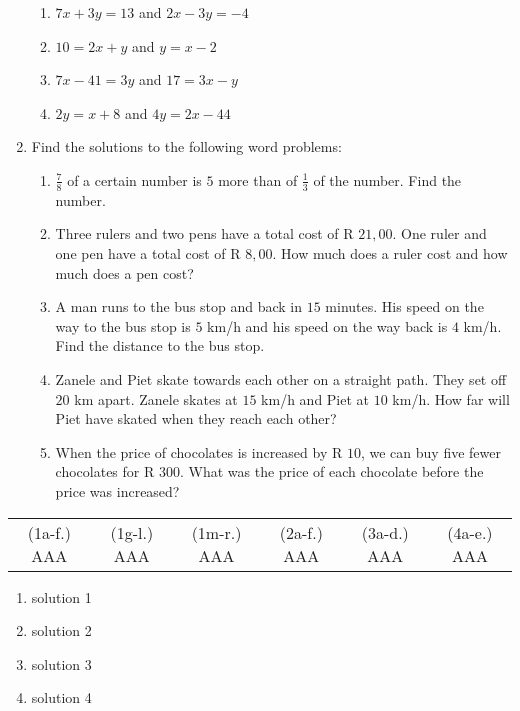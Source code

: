 \begin{eocexercises}{}
\begin{enumerate}[itemsep=5pt, label=\textbf{\arabic*}. ]
\begin{enumerate}[itemsep=5pt,label=\textbf{(\alph*)}]
\item $7x+3y=13$ and $2x-3y=-4$  
\item $10=2x+y$ and $y=x-2$
\item $7x-41=3y$ and $17=3x-y$
\item $2y=x+8$ and $4y=2x-44$
\end{enumerate}
\item Find the solutions to the following word problems:
\begin{enumerate}[itemsep=5pt,label=\textbf{(\alph*)}]
\item $\frac{7}{8}$ of a certain number is $5$ more than of $\frac{1}{3}$ of the number. Find the number.
\item Three rulers and two pens have a total cost of R $21,00$. One ruler and one pen have a total cost of R $8,00$. How much does a ruler cost and how much does a pen cost? 
\item A man runs to the bus stop and back in $15$ minutes. His speed on the way to the bus stop is $5$ km/h and his speed on the way back is $4$ km/h. Find the distance to the bus stop.
\item Zanele and Piet skate towards each other on a straight path. They set off $20$ km apart. Zanele skates at $15$ km/h and Piet at $10$ km/h. How far will Piet have skated when they reach each other?
\item When the price of chocolates is increased by R $10$, we can buy five fewer chocolates for R $300$. What was the price of each chocolate before the price was increased?
\end{enumerate}
\end{enumerate}
\practiceinfo
\par 
\par \begin{tabular}[h]{cccccc} 
(1a-f.) AAA  &  (1g-l.) AAA & (1m-r.) AAA  &  (2a-f.) AAA  &  (3a-d.) AAA  &  (4a-e.) AAA \end{tabular}
\end{eocexercises}


 \begin{solutions}{}{
\begin{enumerate}[itemsep=5pt, label=\textbf{\arabic*}. ] 


\item solution 1
\item solution 2
\item solution 3
\item solution 4

\end{enumerate}}
\end{solutions}


